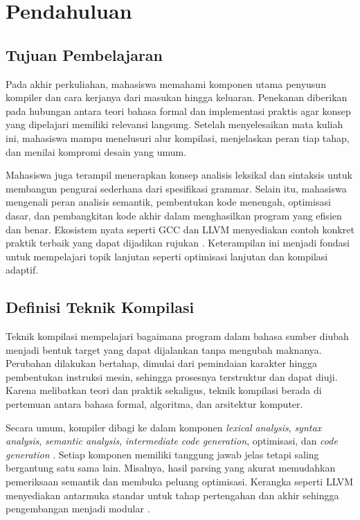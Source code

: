 \documentclass[../main.tex]{subfiles}
\begin{document}
\chapter{Pendahuluan}

\section{Tujuan Pembelajaran}
Pada akhir perkuliahan, mahasiswa memahami komponen utama penyusun kompiler dan cara kerjanya dari masukan hingga keluaran. Penekanan diberikan pada hubungan antara teori bahasa formal dan implementasi praktis agar konsep yang dipelajari memiliki relevansi langsung. Setelah menyelesaikan mata kuliah ini, mahasiswa mampu menelusuri alur kompilasi, menjelaskan peran tiap tahap, dan menilai kompromi desain yang umum.

Mahasiswa juga terampil menerapkan konsep analisis leksikal dan sintaksis untuk membangun pengurai sederhana dari spesifikasi grammar. Selain itu, mahasiswa mengenali peran analisis semantik, pembentukan kode menengah, optimisasi dasar, dan pembangkitan kode akhir dalam menghasilkan program yang efisien dan benar. Ekosistem nyata seperti GCC dan LLVM menyediakan contoh konkret praktik terbaik yang dapat dijadikan rujukan \citep{GCCInternals,LLVMOverview}. Keterampilan ini menjadi fondasi untuk mempelajari topik lanjutan seperti optimisasi lanjutan dan kompilasi adaptif.

\section{Definisi Teknik Kompilasi}
Teknik kompilasi mempelajari bagaimana program dalam bahasa sumber diubah menjadi bentuk target yang dapat dijalankan tanpa mengubah maknanya. Perubahan dilakukan bertahap, dimulai dari pemindaian karakter hingga pembentukan instruksi mesin, sehingga prosesnya terstruktur dan dapat diuji. Karena melibatkan teori dan praktik sekaligus, teknik kompilasi berada di pertemuan antara bahasa formal, algoritma, dan arsitektur komputer.

Secara umum, kompiler dibagi ke dalam komponen \emph{lexical analysis}, \emph{syntax analysis}, \emph{semantic analysis}, \emph{intermediate code generation}, optimisasi, dan \emph{code generation} \citep{Mogensen2010,Wirth1996}. Setiap komponen memiliki tanggung jawab jelas tetapi saling bergantung satu sama lain. Misalnya, hasil parsing yang akurat memudahkan pemeriksaan semantik dan membuka peluang optimisasi. Kerangka seperti LLVM menyediakan antarmuka standar untuk tahap pertengahan dan akhir sehingga pengembangan menjadi modular \citep{LLVMOverview}.
\end{document}
